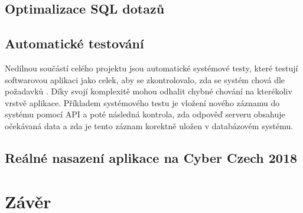 \documentclass[
  digital, %
  twoside, %
  table,   %
  lof,     %
  lot,     %
]{fithesis3}
\begin{document}
\section{Optimalizace SQL dotazů}

\section{Automatické testování}

Nedílnou součástí celého projektu jsou automatické systémové testy, které testují softwarovou aplikaci jako celek, aby se zkontrolovalo, zda se systém chová dle požadavků \cite{difSysTest}. Díky svojí komplexitě mohou odhalit chybné chování na kterékoliv vrstvě aplikace. Příkladem systémového testu je vložení nového záznamu do systému pomocí API a poté následná kontrola, zda odpověď serveru obsahuje očekávaná data a zda je tento záznam korektně uložen v databázovém systému.

\section{Reálné nasazení aplikace na Cyber Czech 2018}



\chapter{Závěr}

\printbibliography[heading=bibintoc] %
\end{document}
